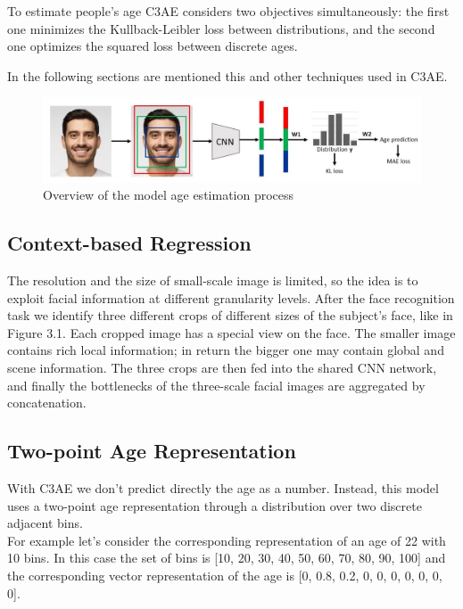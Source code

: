To estimate people's age C3AE considers two objectives simultaneously: the first one minimizes the 
Kullback-Leibler loss between distributions, and the second one optimizes the squared loss between 
discrete ages.

In the following sections are mentioned this and other techniques used in C3AE.

\begin{figure}[!ht]
    \centering
    \includegraphics[width=400pt]{images/model.jpg}
    \caption{Overview of the model age estimation process}
    \label{fig:overview}
\end{figure}

\subsection*{Context-based Regression}
The resolution and the size of small-scale image is limited, so the idea is to exploit facial information 
at different granularity levels. 
After the face recognition task we identify three different crops of different sizes of the subject's face, 
like in Figure 3.1. Each cropped image has a special view on the face. 
The smaller image contains rich local information; in return the bigger one may contain global and scene 
information.
The three crops are then fed into the shared CNN network, and finally the bottlenecks of the
three-scale facial images are aggregated by concatenation.

\subsection*{Two-point Age Representation}
With C3AE we don't predict directly the age as a number. Instead, this model uses a two-point age 
representation through a distribution over two discrete adjacent bins.\\
For example let's consider the corresponding representation of an age of 22 with 10 bins. In this 
case the set of bins is [10, 20, 30, 40, 50, 60, 70, 80, 90, 100] and the corresponding vector 
representation of the age is [0, 0.8, 0.2, 0, 0, 0, 0, 0, 0, 0].

